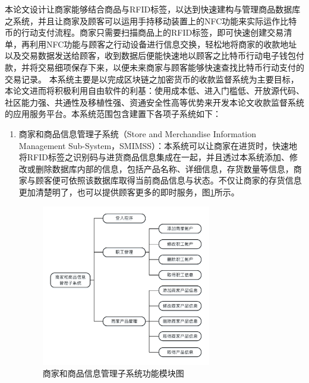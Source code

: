 	本论文设计让商家能够结合商品与RFID标签，以达到快速建构与管理商品数据库之系统，并且让商家及顾客可以运用手持移动装置上的NFC功能来实际运作比特币的行动支付流程。商家只需要扫描商品上的RFID标签，即可快速创建交易清单，再利用NFC功能与顾客之行动设备进行信息交换，轻松地将商家的收款地址以及交易数据发送给顾客，收到数据后便能快速地以顾客之比特币行动电子钱包付款，并将交易细项保存下来，以便未来商家与顾客能够快速查找比特币行动支付的交易记录。
	本系统主要是以完成区块链之加密货币的收款监督系统为主要目标，本论文进而将积极利用自由软件的利基：使用成本低、进入门槛低、开放源代码、社区能力强、共通性及移植性强、资通安全性高等优势来开发本论文收款监督系统的应用服务平台。本系统范围包含建置下各项子系统如下：
		\begin{enumerate}
		\item 商家和商品信息管理子系统（Store and Merchandise Information Management Sub-System，SMIMSS）：本系统可以让商家在进货时，快速地将RFID标签之识别码与进货商品信息集成在一起，并且透过本系统添加、修改或删除数据库内部的信息，包括产品名称、详细信息，存货数量等信息，商家与顾客便可依照该数据库取得当前商品信息与状态。不仅让商家的存货信息更加清楚明了，也可以提供顾客更多的即时服务，图\ref{model1}所示。

			\begin{figure}[!htbp]
			\centering
			\includegraphics[width = 0.7\textwidth]{model1.pdf}
			\caption{商家和商品信息管理子系统功能模块图}\label{model1}
			\end{figure}




\end{enumerate}
